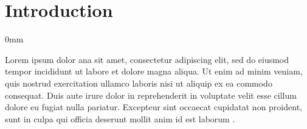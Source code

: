 \documentclass[./main.tex]{subfiles}
\begin{document}
\section{Introduction} \label{introduction}

\begin{adjustwidth}{\bodytab}{0mm}

\par Lorem ipsum dolor \acrshort{ana} sit amet, consectetur adipiscing elit, sed do eiusmod tempor incididunt ut labore et dolore magna aliqua. Ut enim ad minim veniam, quis nostrud exercitation ullamco laboris nisi ut aliquip ex ea commodo consequat. Duis aute irure dolor in reprehenderit in voluptate velit esse cillum dolore eu fugiat nulla pariatur. Excepteur sint occaecat cupidatat non proident, sunt in culpa qui officia deserunt mollit anim id est laborum \cite{Pearce2002a}.



\end{adjustwidth}
\end{document}
